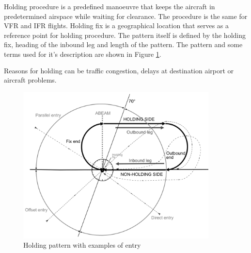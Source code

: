 Holding procedure is a predefined manoeuvre that keeps the aircraft in predetermined airspace while waiting for clearance. The procedure is the same for VFR and IFR flights. Holding fix is a geographical location that serves as a reference point for holding procedure. The pattern itself is defined by the holding fix, heading of the inbound leg and length of the pattern. \cite[Chapter 6]{doc4444} The pattern and some terms used for it's description are shown in Figure \ref{fig:holding}.

Reasons for holding can be traffic congestion, delays at destination airport or aircraft problems.


\begin{figure}[h]
    \centering
    \includegraphics[width=0.9\textwidth]{figures/holding.png}
    \caption{Holding pattern with examples of entry}
    \label{fig:holding}
\end{figure}



